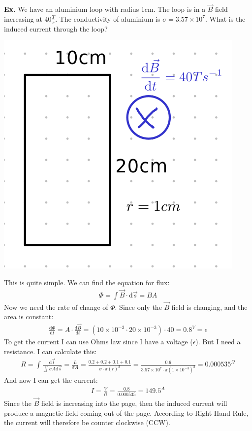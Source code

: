 \documentclass[12pt,letterpaper]{article} \usepackage{amsmath} \usepackage{graphicx} \usepackage[margin=1in]{geometry} \usepackage{longtable}  \usepackage{amssymb}
\begin{document}
	\begin{mdframed}
		\textbf{Ex. }We have an aluminium loop with radius 1cm. The loop is in a $\vec B$ field increasing at $40 \frac{T}{s}$. The conductivity of aluminium is $\sigma = 3.57\times 10^7$. What is the induced current through the loop?
		\begin{center}
			\includegraphics[width=0.3\linewidth]{changing-current-ex}
		\end{center}
		This is quite simple. We can find the equation for flux:
		\begin{align*}
			\Phi = \int \vec B \cdot \mathrm d \vec s = BA
		\end{align*}
		Now we need the rate of change of $\Phi$. Since only the $\vec B$ field is changing, and the area is constant:
		\begin{align*}
			\frac{\mathrm d\Phi}{\mathrm d t} = A \cdot \frac{\mathrm d \vec B}{\mathrm d t} = (10\times 10^{-3} \cdot 20\times 10^{-3}) \cdot 40 = 0.8^V = \epsilon
		\end{align*}
		To get the current I can use Ohms law since I have a voltage ($\epsilon$). But I need a resistance. I can calculate this:
		\begin{align*}
			R = \int \frac{\mathrm d \vec l}{\iint \sigma A \mathrm d \vec s} = \frac{L}{\sigma A} = \frac{0.2+0.2+0.1+0.1}{\sigma \cdot \pi (r)^2} = \frac{0.6}{3.57\times 10^7\cdot \pi(1\times 10^{-3})^2} = 0.000535 ^\Omega
		\end{align*}
		And now I can get the current:
		\begin{align*}
			I = \frac{V}{R} = \frac{0.8}{0.000535} = 149.5^A
		\end{align*}
		Since the $\vec B$ field is increasing into the page, then the induced current will produce a magnetic field coming out of the page. According to Right Hand Rule, the current will therefore be counter clockwise (CCW).
	\end{mdframed}
	
	
\end{document}
